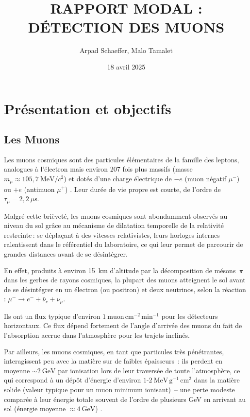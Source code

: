 \documentclass[a4paper,12pt,twoside]{article}
\title{RAPPORT MODAL :\\ DÉTECTION DES MUONS}
\author{Arpad Schaeffer, Malo Tamalet}
\date{18 avril 2025}
\begin{document}
\maketitle

\tableofcontents


\section{Présentation et objectifs}
\subsection{Les Muons}
Les muons cosmiques sont des particules élémentaires de la famille des leptons, analogues à l’électron mais environ 207 fois plus massifs (masse $m_\mu \approx 105{,}7\ \mathrm{MeV}/c^2$) et dotés d’une charge électrique de $-e$ (muon négatif $\mu^-$) ou $+e$ (antimuon $\mu^+$) \cite{knoll2010, wikimuon}. Leur durée de vie propre est courte, de l’ordre de $\tau_\mu = 2{,}2\ \mu\mathrm{s}$. 

Malgré cette brièveté, les muons cosmiques sont abondamment observés au niveau du sol grâce au mécanisme de dilatation temporelle de la relativité restreinte\,:
se déplaçant à des vitesses relativistes, leurs horloges internes \og ralentissent\fg{} dans le référentiel du laboratoire, ce qui leur permet de parcourir de grandes distances avant de se désintégrer.

En effet, produits à environ 15~km d’altitude par la décomposition de mésons~$\pi$ dans les gerbes de rayons cosmiques, la plupart des muons atteignent le sol avant de se désintégrer en un électron (ou positron) et deux neutrinos, selon la réaction : $\mu^- \to e^- + \bar{\nu}_e + \nu_\mu$.

Ils ont un flux typique d’environ $1\ \text{muon}\,\mathrm{cm^{-2}}\,\mathrm{min^{-1}}$
pour les détecteurs horizontaux. Ce flux dépend fortement de l’angle d’arrivée des muons du fait de l’absorption accrue dans l’atmosphère pour les trajets inclinés.

Par ailleurs, les muons cosmiques, en tant que particules très pénétrantes, interagissent peu avec la matière sur de faibles épaisseurs : ils perdent en moyenne $\sim2\ \mathrm{GeV}$ par ionisation lors de leur traversée de toute l’atmosphère, ce qui correspond à un dépôt d’énergie d’environ $1\text{-}2\ \mathrm{MeV}\,\mathrm{g^{-1}}\,\mathrm{cm^2}$
dans la matière solide (valeur typique pour un muon minimum ionisant) – une perte modeste comparée à leur énergie totale souvent de l’ordre de plusieurs GeV en arrivant au sol (énergie moyenne $\approx4\ \mathrm{GeV}$) \cite{bethe1930}.
\newpage
\end{document}

